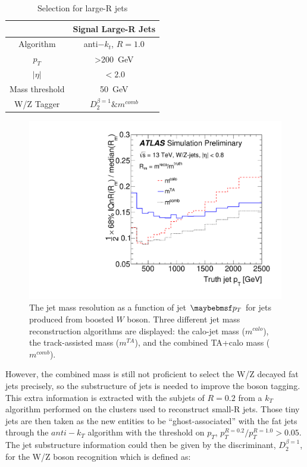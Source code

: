 \begin{table}[h]
	\caption{Selection for large-R jets}\label{Tab:Jdefinit}
	\vspace{2.0em}
	\centering
	\begin{tabular}{|c||c|}
		\hline
		& Signal Large-R Jets\\
		\hline
		Algorithm & anti$-k_t$, $R=1.0$\\
		$p_{T}$   & >200~GeV\\
		$| \eta |$      & $< 2.0 $\\
		Mass threshold  & 50~GeV\\
		W/Z Tagger &  $D^{\beta =1}_2 \& m^{comb}$ \\
		\hline
	\end{tabular}
\end{table}
\begin{figure}[ht]
	\begin{center}
		\includegraphics[width=0.6\hsize]{Chapter3/mass_resolution}
		\caption{The jet mass resolution as a function of jet $\p_{T}$ for jets produced from boosted $W$ boson\cite{ATLAS-CONF-2016-035}. Three different jet mass reconstruction algorithms are displayed: the calo-jet mass ($m^{{calo}}$), the track-assisted mass ($m^{{TA}}$), and the combined TA+calo mass ($m^{{comb}}$).}
		\label{Fig:combinedmassperformance}
	\end{center}
\end{figure}
\noindent
However, the combined mass is still not proficient to select the W/Z decayed fat jets precisely, so the substructure of jets is needed to improve the boson tagging. This extra information is extracted with the subjets of $R=0.2$ from a $k_{T}$ algorithm performed on the clusters used to reconstruct small-R jets. Those tiny jets are then taken as the new entities to be ``ghost-associated'' with the fat jets through the $anti-k_{T}$ algorithm with the threshold on $p_{T}$, $p_{T}^{R=0.2}/p_{T}^{R=1.0}>0.05$. The jet substructure information could then be given by the discriminant, $D^{\beta =1}_{2}$, for the W/Z boson recognition\cite{Larkoski:2014gra} which is defined as:
